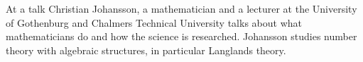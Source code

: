 At a talk Christian Johansson, a mathematician and a lecturer at the University of Gothenburg and Chalmers Technical University talks about what mathematicians do and how the science is researched. Johansson studies number theory with algebraic structures, in particular Langlands theory.


